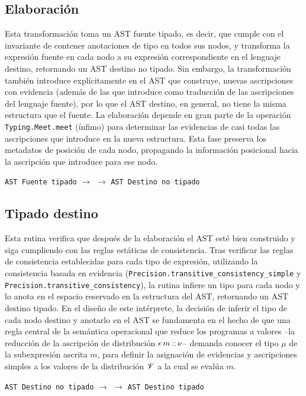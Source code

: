 \subsection{Elaboración} Esta transformación toma un AST fuente tipado, es decir, que cumple con el invariante de contener anotaciones de tipo en todos sus nodos, y transforma la expresión fuente en cada nodo a su expresión correspondiente en el lenguaje destino, retornando un AST destino no tipado. Sin embargo, la transformación también introduce explícitamente en el AST que construye, nuevas ascripciones con evidencia (además de las que introduce como traducción de las ascripciones del lenguaje fuente), por lo que el AST destino, en general, no tiene la misma estructura que el fuente. La elaboración depende
en gran parte de la operación \verb|Typing.Meet.meet| (ínfimo) para determinar las evidencias de casi todas las ascripciones que introduce en la nueva estructura. Esta fase preserva los metadatos de posición de cada nodo, propagando la información posicional hacia la ascripción que introduce para ese nodo.
\begin{center}
  \texttt{AST Fuente tipado}
  $\rightarrow$
  $\rightarrow$
  \texttt{AST Destino no tipado}
\end{center}





\subsection{Tipado destino} Esta rutina verifica que después de la
elaboración el AST esté bien construido y siga cumpliendo con las reglas
estáticas de consistencia. Tras verificar las reglas de consistencia
establecidas para cada tipo de expresión, utilizando la consistencia
basada en evidencia (\verb|Precision.transitive_consistency_simple| y
\verb|Precision.transitive_consistency|), la rutina infiere un tipo
para cada nodo y lo anota en el espacio reservado en la estructura del
AST, retornando un AST destino tipado.  En el diseño de este
intérprete, la decisión de inferir el tipo de cada nodo destino y
anotarlo en el AST se fundamenta en el hecho de que una regla
central de la semántica operacional que reduce los programas a valores
--la reducción de la ascripción de distribución
$\epsilon\, m \mathop{\text{\sffamily ::}} \nu$-- demanda conocer el tipo $\mu$ de la
subexpresión ascrita $m$, para definir la asignación de evidencias y
ascripciones simples a los valores de la distribución $\mathscr{V}$ a la
cual se evalúa $m$.
\begin{center}
  \texttt{AST Destino no tipado}
  $\rightarrow$
  $\rightarrow$
  \texttt{AST Destino tipado}
\end{center}



